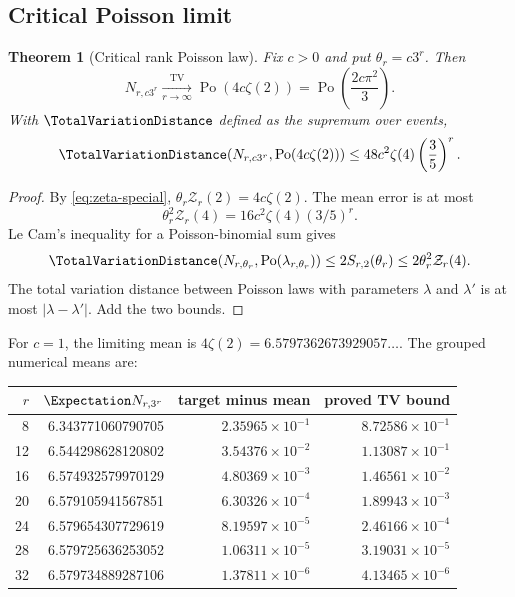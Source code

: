 \documentclass[11pt,oneside]{article}
\newtheorem{theorem}{Theorem}[section]
\theoremstyle{definition}
\theoremstyle{remark}
\newcommand{\Po}{\operatorname{Po}}
\newcommand{\ZetaR}{\mathcal Z}
\begin{document}
\subsection{Critical Poisson limit}

\begin{theorem}[Critical rank Poisson law]\label{thm:critical-Poisson}
Fix $c>0$ and put $\theta_r=c3^r$.  Then
\begin{equation}\label{eq:critical-Poisson}
 N_{r,c3^r}\xrightarrow[r\to\infty]{\mathrm{TV}}
 \Po\!\left(4c\zeta(2)\right)
 =\Po\!\left(\frac{2c\pi^2}{3}\right).
\end{equation}
With $\TotalVariationDistance$ defined as the supremum over events,
\begin{equation}\label{eq:critical-TV}
 \TotalVariationDistance\!\left(N_{r,c3^r},\Po(4c\zeta(2))\right)
 \leq48c^2\zeta(4)\left(\frac35\right)^r.
\end{equation}
\end{theorem}

\begin{proof}
By \eqref{eq:zeta-special},
$\theta_r\ZetaR_r(2)=4c\zeta(2)$.  The mean error is at most
\[
 \theta_r^2\ZetaR_r(4)
 =16c^2\zeta(4)(3/5)^r.
\]
Le Cam's inequality for a Poisson-binomial sum gives
\[
 \TotalVariationDistance(N_{r,\theta_r},\Po(\lambda_{r,\theta_r}))
 \leq2S_{r,2}(\theta_r)
 \leq2\theta_r^2\ZetaR_r(4).
\]
The total variation distance between Poisson laws with parameters $\lambda$
and $\lambda'$ is at most $|\lambda-\lambda'|$.  Add the two bounds.
\end{proof}

For $c=1$, the limiting mean is
$4\zeta(2)=6.5797362673929057\ldots$.  The grouped numerical means are:
\begin{center}
\begin{tabular}{@{}rrrr@{}}
\toprule
$r$ & $\Expectation N_{r,3^r}$ & target minus mean & proved TV bound\\
\midrule
8  & 6.343771060790705 & $2.35965\times10^{-1}$ & $8.72586\times10^{-1}$\\
12 & 6.544298628120802 & $3.54376\times10^{-2}$ & $1.13087\times10^{-1}$\\
16 & 6.574932579970129 & $4.80369\times10^{-3}$ & $1.46561\times10^{-2}$\\
20 & 6.579105941567851 & $6.30326\times10^{-4}$ & $1.89943\times10^{-3}$\\
24 & 6.579654307729619 & $8.19597\times10^{-5}$ & $2.46166\times10^{-4}$\\
28 & 6.579725636253052 & $1.06311\times10^{-5}$ & $3.19031\times10^{-5}$\\
32 & 6.579734889287106 & $1.37811\times10^{-6}$ & $4.13465\times10^{-6}$\\
\bottomrule
\end{tabular}
\end{center}
\end{document}
